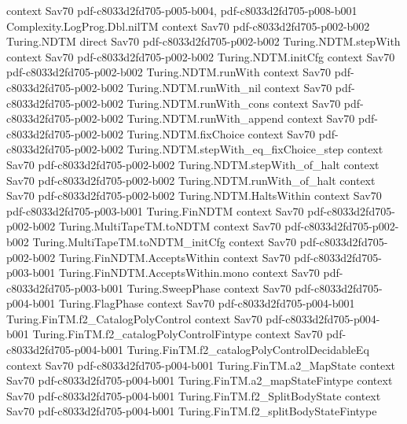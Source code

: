 \begin{theorem}
  {context}
  {Sav70}
  {pdf-c8033d2fd705-p005-b004,
    pdf-c8033d2fd705-p008-b001}
\proofstep
  {Complexity.LogProg.Dbl.nilTM}
  {context}
  {Sav70}
  {pdf-c8033d2fd705-p002-b002}
\proofstep
  {Turing.NDTM}
  {direct}
  {Sav70}
  {pdf-c8033d2fd705-p002-b002}
\proofstep
  {Turing.NDTM.stepWith}
  {context}
  {Sav70}
  {pdf-c8033d2fd705-p002-b002}
\proofstep
  {Turing.NDTM.initCfg}
  {context}
  {Sav70}
  {pdf-c8033d2fd705-p002-b002}
\proofstep
  {Turing.NDTM.runWith}
  {context}
  {Sav70}
  {pdf-c8033d2fd705-p002-b002}
\proofstep
  {Turing.NDTM.runWith_nil}
  {context}
  {Sav70}
  {pdf-c8033d2fd705-p002-b002}
\proofstep
  {Turing.NDTM.runWith_cons}
  {context}
  {Sav70}
  {pdf-c8033d2fd705-p002-b002}
\proofstep
  {Turing.NDTM.runWith_append}
  {context}
  {Sav70}
  {pdf-c8033d2fd705-p002-b002}
\proofstep
  {Turing.NDTM.fixChoice}
  {context}
  {Sav70}
  {pdf-c8033d2fd705-p002-b002}
\proofstep
  {Turing.NDTM.stepWith_eq_fixChoice_step}
  {context}
  {Sav70}
  {pdf-c8033d2fd705-p002-b002}
\proofstep
  {Turing.NDTM.stepWith_of_halt}
  {context}
  {Sav70}
  {pdf-c8033d2fd705-p002-b002}
\proofstep
  {Turing.NDTM.runWith_of_halt}
  {context}
  {Sav70}
  {pdf-c8033d2fd705-p002-b002}
\proofstep
  {Turing.NDTM.HaltsWithin}
  {context}
  {Sav70}
  {pdf-c8033d2fd705-p003-b001}
\proofstep
  {Turing.FinNDTM}
  {context}
  {Sav70}
  {pdf-c8033d2fd705-p002-b002}
\proofstep
  {Turing.MultiTapeTM.toNDTM}
  {context}
  {Sav70}
  {pdf-c8033d2fd705-p002-b002}
\proofstep
  {Turing.MultiTapeTM.toNDTM_initCfg}
  {context}
  {Sav70}
  {pdf-c8033d2fd705-p002-b002}
\proofstep
  {Turing.FinNDTM.AcceptsWithin}
  {context}
  {Sav70}
  {pdf-c8033d2fd705-p003-b001}
\proofstep
  {Turing.FinNDTM.AcceptsWithin.mono}
  {context}
  {Sav70}
  {pdf-c8033d2fd705-p003-b001}
\proofstep
  {Turing.SweepPhase}
  {context}
  {Sav70}
  {pdf-c8033d2fd705-p004-b001}
\proofstep
  {Turing.FlagPhase}
  {context}
  {Sav70}
  {pdf-c8033d2fd705-p004-b001}
\proofstep
  {Turing.FinTM.f2_CatalogPolyControl}
  {context}
  {Sav70}
  {pdf-c8033d2fd705-p004-b001}
\proofstep
  {Turing.FinTM.f2_catalogPolyControlFintype}
  {context}
  {Sav70}
  {pdf-c8033d2fd705-p004-b001}
\proofstep
  {Turing.FinTM.f2_catalogPolyControlDecidableEq}
  {context}
  {Sav70}
  {pdf-c8033d2fd705-p004-b001}
\proofstep
  {Turing.FinTM.a2_MapState}
  {context}
  {Sav70}
  {pdf-c8033d2fd705-p004-b001}
\proofstep
  {Turing.FinTM.a2_mapStateFintype}
  {context}
  {Sav70}
  {pdf-c8033d2fd705-p004-b001}
\proofstep
  {Turing.FinTM.f2_SplitBodyState}
  {context}
  {Sav70}
  {pdf-c8033d2fd705-p004-b001}
\proofstep
  {Turing.FinTM.f2_splitBodyStateFintype}

\end{theorem}
